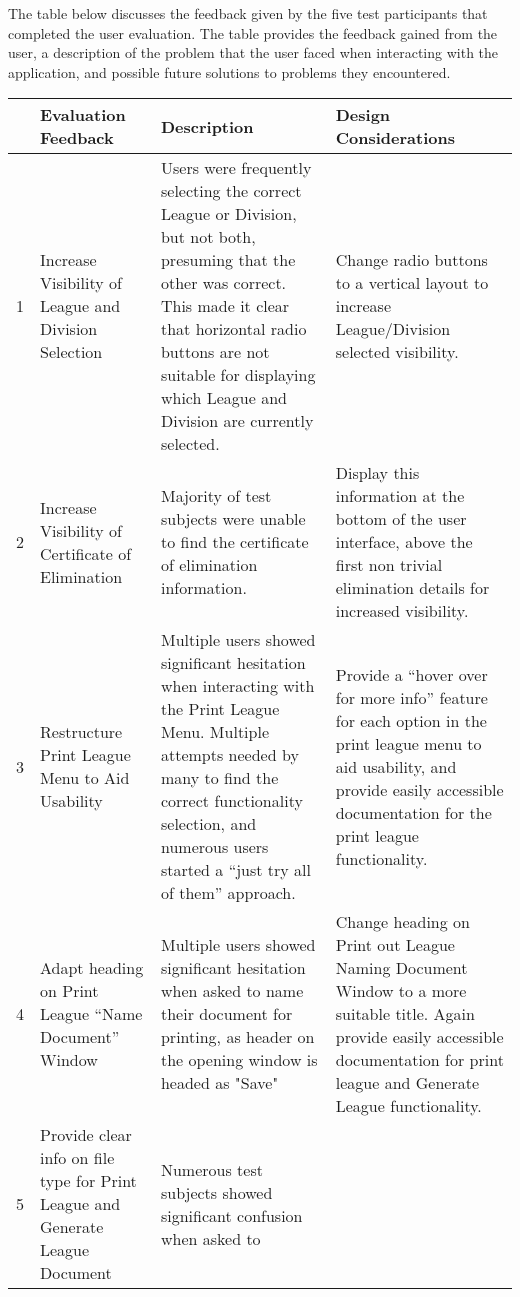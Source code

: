 The table below discusses the feedback given by the five test participants that 
completed the user evaluation. The table provides the feedback gained from the 
user, a description of the problem that the user faced when interacting with 
the application, and possible future solutions to problems they encountered. 

\begin{table}[t]
\begin{tabular}{|l|p{}|p{}|p{}|}
\hline
 & Evaluation Feedback & Description & Design Considerations  \\
\hline
1 & Increase Visibility of League and Division Selection & Users were frequently 
selecting the correct League or Division, but not both, presuming that the other 
was correct. This made it clear that horizontal radio buttons are not suitable 
for displaying which League and Division are currently selected. & Change radio 
buttons to a vertical layout to increase League/Division selected visibility.\\
\hline
2 & Increase Visibility of Certificate of Elimination & Majority of test 
subjects were unable to find the certificate of elimination information. & 
Display this information at the bottom of the user interface, above the first 
non trivial elimination details for increased visibility.\\
\hline
3 & Restructure Print League Menu to Aid Usability & Multiple users showed 
significant hesitation when interacting with the Print League Menu. Multiple 
attempts needed by many to find the correct functionality selection, and 
numerous users started a ``just try all of them'' approach. & Provide a ``hover 
over for more info'' feature for each option in the print league menu to aid 
usability, and provide easily accessible documentation for the print league 
functionality.\\
\hline
4 & Adapt heading on Print League ``Name Document'' Window & Multiple users 
showed significant hesitation when asked to name their document for printing, as 
header on the opening window is headed as "Save" & Change heading on Print out 
League Naming Document Window to a more suitable title. Again provide easily 
accessible documentation for print league and Generate League functionality.\\
\hline
5 & Provide clear info on file type for Print League and Generate League 
Document & Numerous test subjects showed significant confusion when asked to 

\end{tabular}
\end{table}
